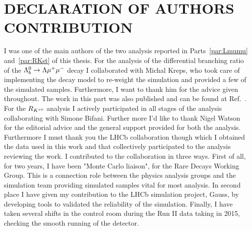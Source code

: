 \chapter*{DECLARATION OF AUTHORS CONTRIBUTION}
%
I was one of the main authors of the two analysis reported in Parts~\ref{par:Lmumu} and~\ref{par:RKst}
of this thesis. For the analysis of the differential branching ratio of the $\Lambda^0_b\rightarrow\Lambda\mu^+\mu^-$ decay
I collaborated with Michal Kreps, who took care of implementing the decay model to re-weight
the simulation and provided a few of the simulated samples. Furthermore, I want to thank him
for the advice given throughout. The work in this part was also published and can be found at Ref.~\cite{Aaij:2015xza}.
For the $R_{K^{*0}}$ analysis I actively participated in all stages of the analysis collaborating with Simone Bifani. Further more I'd like to thank Nigel Watson for the editorial advice and 
the general support provided for both the analysis. Furthermore I must thank you the LHCb collaboration
though which I obtained the data used in this work and that collectively participated to the analysis
reviewing the work. I contributed to the collaboration in three ways. First of all, for two years,
I have been "Monte Carlo liaison", for the Rare Decays Working Group. This is a connection role between the
physics analysis groups and the simulation team providing simulated samples vital for most analysis.
In second place I have given my contribution to the LHCb simulation project, Gauss, by developing tools
to validated the reliability of the simulation. Finally, I have taken several shifts in the control room during
the Run II data taking in 2015, checking the smooth running of the detector.
%
\clearpage
